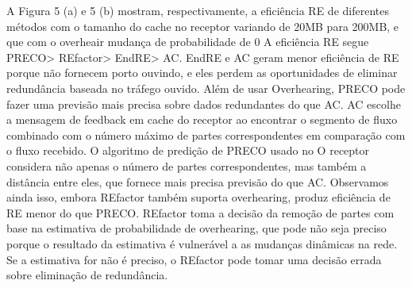 \documentclass[12pt]{article}
\begin{document}
\begin{enumerate}
\begin{enumerate}
		A Figura 5 (a) e 5 (b) mostram, respectivamente, a eficiência RE
		de diferentes métodos com o tamanho do cache no receptor
		variando de 20MB para 200MB, e que com o overheair
		mudança de probabilidade de 0%
		A eficiência RE segue PRECO> REfactor> EndRE> AC. EndRE
		e AC geram menor eficiência de RE porque não fornecem
		porto ouvindo, e eles perdem as oportunidades de eliminar
		redundância baseada no tráfego ouvido. Além de usar
		Overhearing, PRECO pode fazer uma previsão mais precisa sobre
		dados redundantes do que AC. AC escolhe a mensagem de feedback em
		cache do receptor ao encontrar o segmento de fluxo combinado com
		o número máximo de partes correspondentes em comparação com
		o fluxo recebido. O algoritmo de predição de PRECO usado no
		O receptor considera não apenas o número de partes correspondentes, mas
		também a distância entre eles, que fornece mais precisa
		previsão do que AC. Observamos ainda isso, embora REfactor
		também suporta overhearing, produz eficiência de RE menor
		do que PRECO. REfactor toma a decisão da remoção de partes
		com base na estimativa de probabilidade de overhearing, que pode
		não seja preciso porque o resultado da estimativa é vulnerável a
		as mudanças dinâmicas na rede. Se a estimativa for
		não é preciso, o REfactor pode tomar uma decisão errada sobre
		eliminação de redundância.
		

\end{enumerate}
\end{enumerate}
\end{document}
